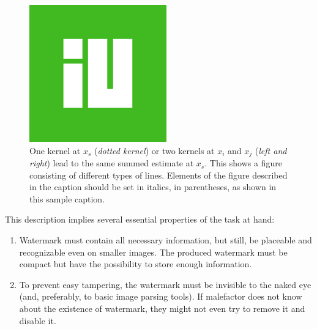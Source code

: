 \begin{figure}[hbt]
    \centering
    \includegraphics[]{figs/images.png}
    \caption{One kernel at $x_s$ (\emph{dotted kernel}) or two kernels at
        $x_i$ and $x_j$ (\textit{left and right}) lead to the same summed estimate
        at $x_s$. This shows a figure consisting of different types of
        lines. Elements of the figure described in the caption should be set in
        italics, in parentheses, as shown in this sample caption.}
    \label{fig:secex}
\end{figure}

This description implies several essential properties of the task at hand:
\begin{enumerate}
    \item Watermark must contain all necessary information, but still, be placeable and recognizable even on smaller images. The produced watermark must be compact but have the possibility to store enough information.
    \item To prevent easy tampering, the watermark must be invisible to the naked eye (and, preferably, to basic image parsing tools). If malefactor does not know about the existence of watermark, they might not even try to remove it and disable it.
\end{enumerate}
